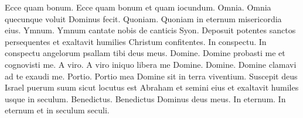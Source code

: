 \begin{multicols*}{2}
 Ecce quam bonum.
 Ecce quam bonum et quam iocundum.
 Omnia.
 Omnia quecunque voluit Dominus fecit.
 Quoniam.
 Quoniam in eternum misericordia eius.
 Ymnum.
 Ymnum cantate nobis de canticis Syon.
 Deposuit potentes sanctos persequentes et exaltavit humilies Christum confitentes.
 In conspectu.
 In conspectu angelorum psallam tibi deus meus.
 Domine.
 Domine probasti me et cognovisti me.
 A viro.
 A viro iniquo libera me Domine.
 Domine.
 Domine clamavi ad te exaudi me.
 Portio.
 Portio mea Domine sit in terra viventium.
 Suscepit deus Israel puerum suum sicut locutus est Abraham et semini eius et exaltavit humiles usque in seculum.
 Benedictus.
 Benedictus Dominus deus meus.
 In eternum.
 In eternum et in seculum seculi.

\end{multicols*}
